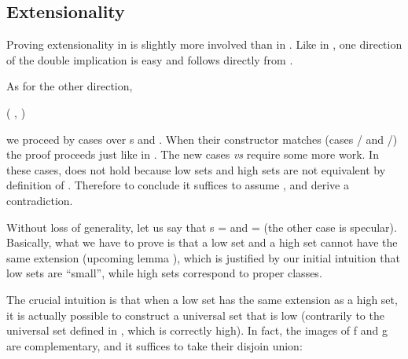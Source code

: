 \subsection{Extensionality}
Proving extensionality in \NFTWO{} is slightly more involved than in \ZF{}. Like in \ZF{}, one direction of the double implication is easy and follows directly from .

As for the other direction, \ie{} \\
\centerline{
  (\coqdockw{\ensuremath{\forall}} ,  \INX {}   \INX {}) %
   \EQX {}
}

\noindent
we proceed by cases over \var s and . When their constructor matches (cases / and /) the proof proceeds just like in \ZF{}. The new cases  \emph{vs}  require some more work. In these cases,  \EQX {} does not hold because low sets and high sets are not equivalent by definition of . Therefore to conclude it suffices to assume \coqdockw{\ensuremath{\forall}} ,  \INX {}   \INX {} and derive a contradiction.

Without loss of generality, let us say that \var s =    and  =    (the other case is specular). Basically, what we have to prove is that a low set and a high set cannot have the same extension (upcoming lemma ), which is justified by our initial intuition that low sets are ``small'', while high sets correspond to proper classes.

\medskip

The crucial intuition is that when a low set has the same extension as a high set, it is actually possible to construct a universal set that is low (contrarily to the universal set defined in , which is correctly high). In fact, the images of \var f and \var g are complementary, and it suffices to take their disjoin union:


